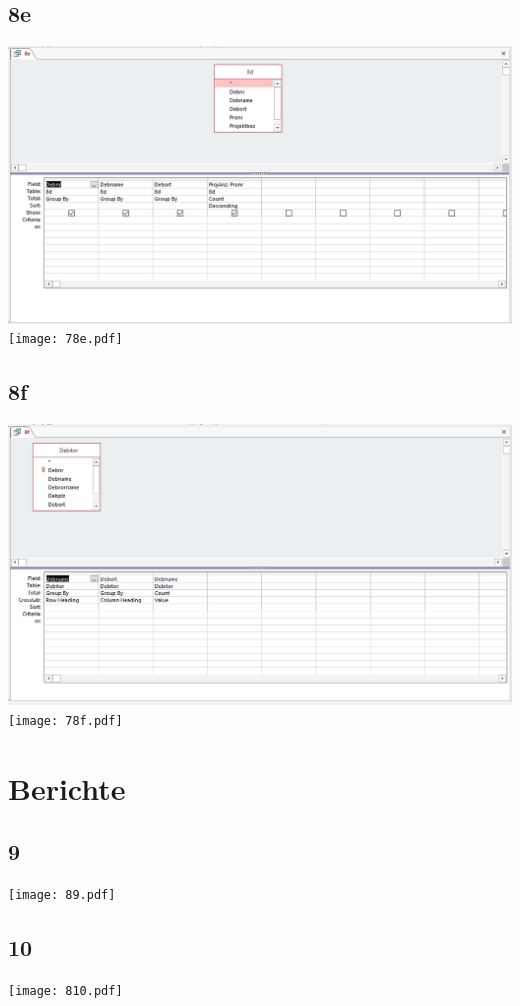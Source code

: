 \subsection{8e}
\includegraphics[width=.98\columnwidth]{78e.PNG}\\
\texttt{[image: 78e.pdf]}
\subsection{8f}
\includegraphics[width=.98\columnwidth]{78f.PNG}\\
\texttt{[image: 78f.pdf]}

\section{Berichte}
\subsection{9}
\texttt{[image: 89.pdf]}
\subsection{10}
\texttt{[image: 810.pdf]}


